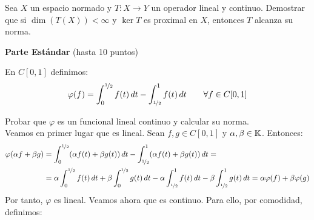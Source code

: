 \documentclass[12pt]{article}
\begin{document}
    \begin{ejercicio}
        Sea $X$ un espacio normado y $T:X\to Y$ un operador lineal y continuo. Demostrar que si $\dim(T(X)) < \infty$ y $\ker T$ es proximal en $X$, entonces $T$ alcanza su norma.
    \end{ejercicio}

    \newpage
    \setcounter{ejercicio}{0} %

    \textbf{Parte Estándar} (hasta 10 puntos)
    \begin{ejercicio}
        En $C[0, 1]$ definimos:
        \begin{equation*}
            \varphi(f) = \int_0^{\nicefrac{1}{2}} f(t)\,dt - \int_{\nicefrac{1}{2}}^1 f(t)\,dt\qquad \forall f \in C[0, 1]
        \end{equation*}

        Probar que $\varphi$ es un funcional lineal continuo y calcular su norma.\\

        Veamos en primer lugar que es lineal. Sean $f, g \in C[0, 1]$ y $\alpha, \beta \in \mathbb{K}$. Entonces:
        \begin{align*}
            \varphi(\alpha f + \beta g) &= \int_0^{\nicefrac{1}{2}} (\alpha f(t) + \beta g(t))\,dt - \int_{\nicefrac{1}{2}}^1 (\alpha f(t) + \beta g(t))\,dt =\\&= \alpha \int_0^{\nicefrac{1}{2}} f(t)\,dt + \beta \int_0^{\nicefrac{1}{2}} g(t)\,dt - \alpha \int_{\nicefrac{1}{2}}^1 f(t)\,dt - \beta \int_{\nicefrac{1}{2}}^1 g(t)\,dt = \alpha \varphi(f) + \beta \varphi(g)
        \end{align*}
        Por tanto, $\varphi$ es lineal. Veamos ahora que es continuo. Para ello, por comodidad, definimos:


\end{ejercicio}
\end{document}
